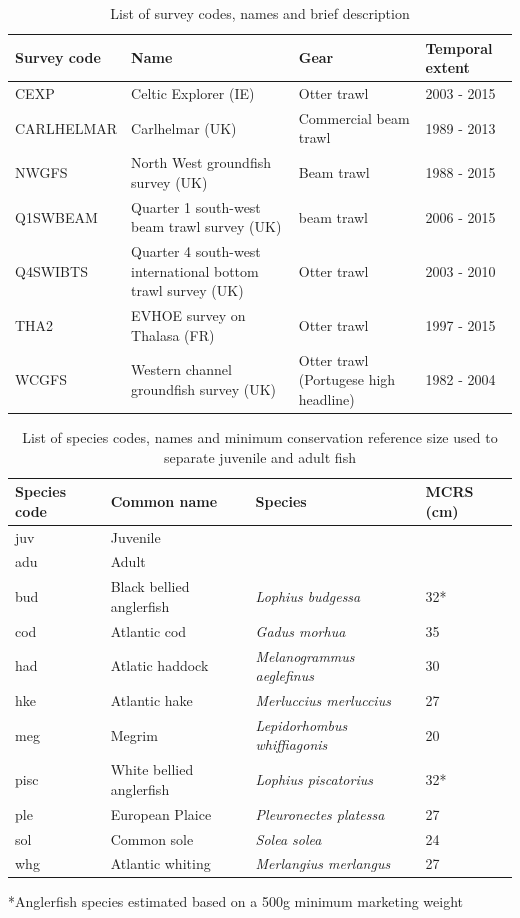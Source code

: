 \documentclass{article}
\begin{document}
\begin{table}[!ht]
	\caption{List of survey codes, names and brief description}
	\center
	\begin{tabular}{ p{3cm} p{4cm} p{4cm} p{3cm} }
		\hline
		Survey code    & Name 	& Gear & Temporal extent \\
		\hline
		CEXP           & Celtic Explorer (IE)   & Otter trawl & 2003 - 2015 \\
		CARLHELMAR     & Carlhelmar (UK)	& Commercial beam trawl & 1989 - 2013 \\
		NWGFS          & North West groundfish survey (UK) & Beam trawl & 1988 - 2015 \\
		Q1SWBEAM       & Quarter 1 south-west beam trawl survey (UK) 	& beam trawl & 2006 - 2015 \\
		Q4SWIBTS       & Quarter 4 south-west international bottom trawl survey (UK) & Otter trawl & 2003 - 2010 \\
		THA2           & EVHOE survey on Thalasa (FR) & Otter trawl & 1997 - 2015 \\
		WCGFS          & Western channel groundfish survey (UK) & Otter
		trawl (Portugese high headline) & 1982 - 2004 \\
		\hline
	\end{tabular}
\end{table}


\begin{table}[!ht]
	\caption{List of species codes, names and minimum conservation
		reference size used to separate juvenile and adult fish}
	\center
	\begin{tabular}{ p{3cm} p{4cm} p{6cm} p{2cm} }
		\hline
		Species code & Common name              & Species & MCRS (cm) \\
		\hline
		juv          & Juvenile                 & \\
		adu          & Adult                    & \\
		\hline
		bud          & Black bellied anglerfish & \textit{Lophius
			budgessa} &  32* \\
		cod          & Atlantic cod             & \textit{Gadus morhua}
		& 35 \\
		had          & Atlatic haddock          & \textit{Melanogrammus
			aeglefinus} & 30 \\
		hke          & Atlantic hake            & \textit{Merluccius
			merluccius} & 27 \\
		meg          & Megrim                   & \textit{Lepidorhombus
			whiffiagonis} & 20 \\
		pisc         & White bellied anglerfish & \textit{Lophius
			piscatorius}	& 32* \\
		ple          & European Plaice          & \textit{Pleuronectes
			platessa} & 27 \\
		sol          & Common sole              & \textit{Solea solea}
		& 24 \\
		whg          & Atlantic whiting         & \textit{Merlangius
			merlangus} & 27 \\
		\hline
	\end{tabular}
	*Anglerfish species estimated based on a 500g minimum marketing weight

\end{table}
\end{document}
